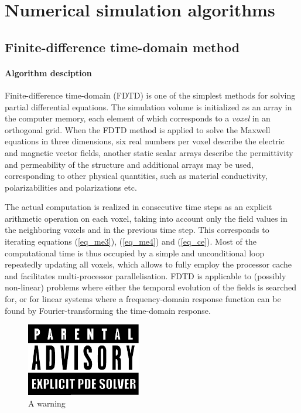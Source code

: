 \section{Numerical simulation algorithms} \label{chapter_numerical}
\subsection{Finite-difference time-domain method}
\paragraph{Algorithm desciption} %
Finite-difference time-domain (FDTD) is one of the simplest methods for solving partial differential equations. The simulation volume is initialized as an array in the computer memory, each element of which corresponds to a \textit{voxel} in an orthogonal grid. When the FDTD method is applied to solve the Maxwell equations in three dimensions, six real numbers per voxel describe the electric and magnetic vector fields, another static scalar arrays describe the permittivity and permeability of the structure and additional arrays may be used, corresponding to other physical quantities, such as material conductivity, polarizabilities and polarizations etc. 

The actual computation is realized in consecutive time steps as an explicit arithmetic operation on each voxel, taking into account only the field values in the neighboring voxels and in the previous time step. This corresponds to iterating equations (\ref{eq_me3}), (\ref{eq_me4}) and (\ref{eq_ce}). %
Most of the computational time is thus occupied by a simple and unconditional loop repeatedly updating all voxels, which allows to fully employ the processor cache and facilitates multi-processor parallelisation. FDTD is applicable to (possibly non-linear) problems where either the temporal evolution of the fields is searched for, or for linear systems where a frequency-domain response function can be found by Fourier-transforming the time-domain response. 
\begin{figure}[ht] \caption{A warning} \label{fg_parental} \centering 
	\includegraphics[width=5cm]{img/Parental_Advisory_label.pdf}
\end{figure}

